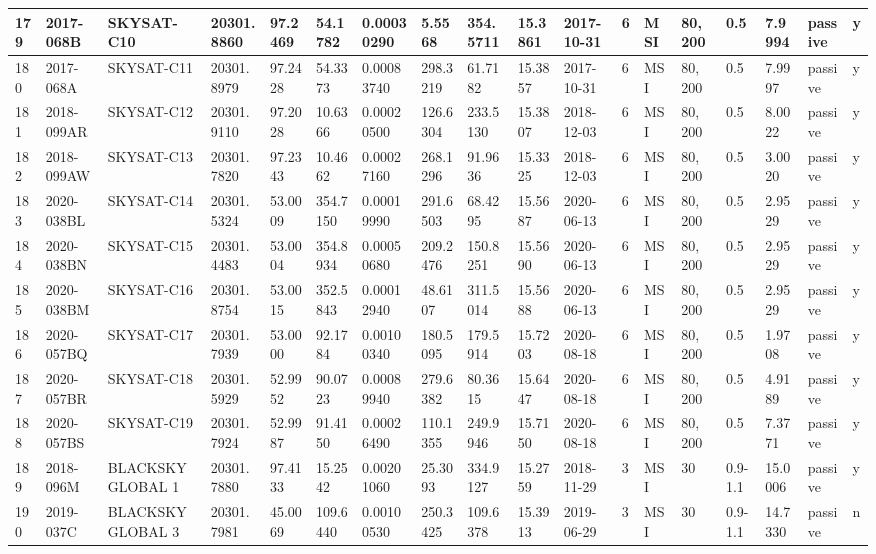 \documentclass[12pt,a4paper,notitlepage,twoside,openright]{report}
\begin{document}
\begin{longtable}{|l|l|l|l|l|l|l|l|l|l|l|l|l|l|l|l|l|l|}
        179 & 2017-068B & SKYSAT-C10 & 20301.8860 & 97.2469 & 54.1782 & 0.00030290 & 5.5568 & 354.5711 & 15.3861 & 2017-10-31 & 6 & MSI & 80, 200 & 0.5 & 7.9994 & passive & y \\ \hline
        180 & 2017-068A & SKYSAT-C11 & 20301.8979 & 97.2428 & 54.3373 & 0.00083740 & 298.3219 & 61.7182 & 15.3857 & 2017-10-31 & 6 & MSI & 80, 200 & 0.5 & 7.9997 & passive & y \\ \hline
        181 & 2018-099AR & SKYSAT-C12 & 20301.9110 & 97.2028 & 10.6366 & 0.00020500 & 126.6304 & 233.5130 & 15.3807 & 2018-12-03 & 6 & MSI & 80, 200 & 0.5 & 8.0022 & passive & y \\ \hline
        182 & 2018-099AW & SKYSAT-C13 & 20301.7820 & 97.2343 & 10.4662 & 0.00027160 & 268.1296 & 91.9636 & 15.3325 & 2018-12-03 & 6 & MSI & 80, 200 & 0.5 & 3.0020 & passive & y \\ \hline
        183 & 2020-038BL & SKYSAT-C14 & 20301.5324 & 53.0009 & 354.7150 & 0.00019990 & 291.6503 & 68.4295 & 15.5687 & 2020-06-13 & 6 & MSI & 80, 200 & 0.5 & 2.9529 & passive & y \\ \hline
        184 & 2020-038BN & SKYSAT-C15 & 20301.4483 & 53.0004 & 354.8934 & 0.00050680 & 209.2476 & 150.8251 & 15.5690 & 2020-06-13 & 6 & MSI & 80, 200 & 0.5 & 2.9529 & passive & y \\ \hline
        185 & 2020-038BM & SKYSAT-C16 & 20301.8754 & 53.0015 & 352.5843 & 0.00012940 & 48.6107 & 311.5014 & 15.5688 & 2020-06-13 & 6 & MSI & 80, 200 & 0.5 & 2.9529 & passive & y \\ \hline
        186 & 2020-057BQ & SKYSAT-C17 & 20301.7939 & 53.0000 & 92.1784 & 0.00100340 & 180.5095 & 179.5914 & 15.7203 & 2020-08-18 & 6 & MSI & 80, 200 & 0.5 & 1.9708 & passive & y \\ \hline
        187 & 2020-057BR & SKYSAT-C18 & 20301.5929 & 52.9952 & 90.0723 & 0.00089940 & 279.6382 & 80.3615 & 15.6447 & 2020-08-18 & 6 & MSI & 80, 200 & 0.5 & 4.9189 & passive & y \\ \hline
        188 & 2020-057BS & SKYSAT-C19 & 20301.7924 & 52.9987 & 91.4150 & 0.00026490 & 110.1355 & 249.9946 & 15.7150 & 2020-08-18 & 6 & MSI & 80, 200 & 0.5 & 7.3771 & passive & y \\ \hline
        189 & 2018-096M & BLACKSKY GLOBAL 1 & 20301.7880 & 97.4133 & 15.2542 & 0.00201060 & 25.3093 & 334.9127 & 15.2759 & 2018-11-29 & 3 & MSI & 30 & 0.9-1.1 & 15.0006 & passive & y \\ \hline
        190 & 2019-037C & BLACKSKY GLOBAL 3 & 20301.7981 & 45.0069 & 109.6440 & 0.00100530 & 250.3425 & 109.6378 & 15.3913 & 2019-06-29 & 3 & MSI & 30 & 0.9-1.1 & 14.7330 & passive & n \\ \hline

\end{longtable}
\end{document}
